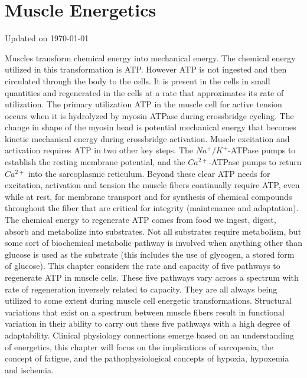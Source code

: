 \chapter{Muscle Energetics}\label{chp:energetics}
Updated on \today
\minitoc

Muscles transform chemical energy into mechanical energy. The chemical energy utilized in this transformation is ATP. However ATP is not ingested and then circulated through the body to the cells. It is present in the cells in small quantities and regenerated in the cells at a rate that approximates its rate of utilization. The primary utilization ATP in the muscle cell for active tension occurs when it is hydrolyzed by myosin ATPase during crossbridge cycling. The change in shape of the myosin head is potential mechanical energy that becomes kinetic mechanical energy during crossbridge activation. Muscle excitation and activation requires ATP in two other key steps. The $Na^+ / K^+$-ATPase pumps to establish the resting membrane potential, and the $Ca^{2+}$-ATPase pumps to return $Ca^{2+}$ into the sarcoplasmic reticulum. Beyond these clear ATP needs for excitation, activation and tension the muscle fibers continually require ATP, even while at rest, for membrane transport and for synthesis of chemical compounds throughout the fiber that are critical for integrity (maintenance and adaptation). 
The chemical energy to regenerate ATP comes from food we ingest, digest, absorb and metabolize into substrates. Not all substrates require metabolism, but some sort of biochemical metabolic pathway is involved when anything other than glucose is used as the substrate (this includes the use of glycogen, a stored form of glucose).
This chapter considers the rate and capacity of five pathways to regenerate ATP in muscle cells. These five pathways vary across a spectrum with rate of regeneration inversely related to capacity. They are all always being utilized to some extent during muscle cell energetic transformations. Structural variations that exist on a spectrum between muscle fibers result in functional variation in their ability to carry out these five pathways with a high degree of adaptability. Clinical physiology connections emerge based on an understanding of energetics, this chapter will focus on the implications of sarcopenia, the concept of fatigue, and the pathophysiological concepts of hypoxia, hypoxemia and ischemia.

\vspace{5mm}

